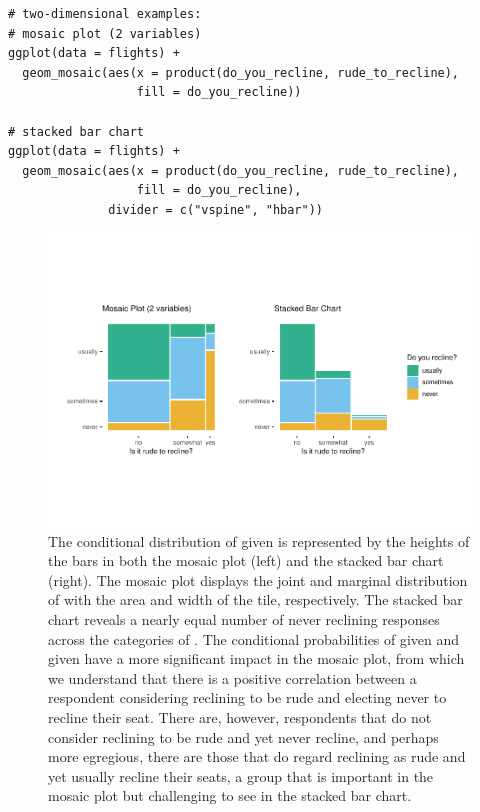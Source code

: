 \begin{verbatim}
# two-dimensional examples:
# mosaic plot (2 variables)
ggplot(data = flights) +
  geom_mosaic(aes(x = product(do_you_recline, rude_to_recline), 
                  fill = do_you_recline))

# stacked bar chart
ggplot(data = flights) + 
  geom_mosaic(aes(x = product(do_you_recline, rude_to_recline), 
                  fill = do_you_recline),
              divider = c("vspine", "hbar"))
\end{verbatim}

\begin{figure}[!h]

{\centering \includegraphics[width=1\linewidth]{RJ-2023-013_files/figure-latex/variety2-1} 

}

\caption{The conditional distribution of  given  is represented by the heights of the bars in both the mosaic plot (left) and the stacked bar chart (right). The mosaic plot displays the joint and marginal distribution of  with the area and width of the tile, respectively. The stacked bar chart reveals a nearly equal number of never reclining responses across the categories of . The conditional probabilities of  given  and  given  have a more significant impact in the mosaic plot, from which we understand that there is a positive correlation between a respondent considering reclining to be rude and electing never to recline their seat. There are, however, respondents that do not consider reclining to be rude and yet never recline, and perhaps more egregious, there are those that do regard reclining as rude and yet usually recline their seats, a group that is important in the mosaic plot but challenging to see in the stacked bar chart.}\label{fig:variety2}
\end{figure}

